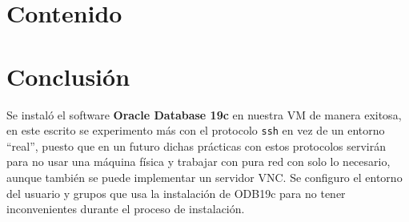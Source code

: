 \documentclass{IEEEtran}
\begin{document}
\section{Contenido}\label{sec:contenido}



\section{Conclusión}\label{sec:conclusion}
Se instaló el software \textbf{Oracle Database 19c} en nuestra VM de manera exitosa,
en este escrito se experimento más con el protocolo \texttt{ssh} en vez de un entorno
``real'', puesto que en un futuro dichas prácticas con estos protocolos servirán para
no usar una máquina física y trabajar con pura red con solo lo necesario, aunque
también se puede implementar un servidor VNC.\@
Se configuro el entorno del usuario y grupos que usa la instalación de ODB19c para no
tener inconvenientes durante el proceso de instalación.
\vfill{}
\listoffigures{}
\listoflistings{}
\nocite{oraclebd2021}
\printbibliography{}
\end{document}
